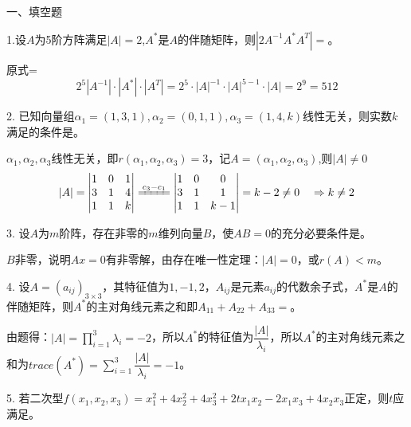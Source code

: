\documentclass{article}
\begin{document}
一、填空题

1.设$A$为5阶方阵满足$|A|=2$,$A^{*}$是$A$的伴随矩阵，则$|2A^{-1}A^{*}A^{T}|=$\underline{\hphantom{~~~~~~~~~~}}。

\begin{jie}
原式=
\begin{equation*}
2^{5}|A^{-1}|\cdot|A^*|\cdot|A^T|=2^{5}\cdot|A|^{-1}\cdot|A|^{5-1}\cdot|A|=2^9=512
\end{equation*}
\end{jie}

2. 已知向量组$\alpha_{1}=(1,3,1),\alpha_{2}=(0,1,1),\alpha_{3}=(1,4,k)$线性无关，则实数$k$满足的条件是\underline{\hphantom{~~~~~~~~~~}}。

\begin{jie}
$\alpha_{1},\alpha_{2},\alpha_{3}$线性无关，即$r(\alpha_{1},\alpha_{2},\alpha_{3})=3$，记$A=(\alpha_{1},\alpha_{2},\alpha_{3})$,则$|A|\neq0$
\begin{equation*}
  |A|=\begin{vmatrix}
       1& 0 & 1\\
       3 & 1 & 4\\
       1 & 1 & k
\end{vmatrix}\xlongequal{c_{3}-c_{1}}
\begin{vmatrix}
1& 0 & 0\\
3 & 1 & 1\\
1 & 1 & k-1
\end{vmatrix}=k-2\neq0~~~\Rightarrow k\neq 2
\end{equation*}
\end{jie}

3. 设$A$为$m$阶阵，存在非零的$m$维列向量$B$，使$AB=0$的充分必要条件是\underline{\hphantom{~~~~~~~~~~}}。

\begin{jie}
$B$非零，说明$Ax=0$有非零解，由存在唯一性定理：$|A|=0$，或$r(A)<m$。
\end{jie}

4. 设$A=(a_{ij})_{3\times 3}$，其特征值为$1,-1,2$，$A_{ij}$是元素$a_{ij}$的代数余子式，$A^{*}$是$A$的伴随矩阵，则$A^{*}$的主对角线元素之和即$A_{11}+A_{22}+A_{33}=$\underline{\hphantom{~~~~~~~~~~}}。

\begin{jie}
由题得：$|A|=\prod\limits_{i=1}^{3}\lambda_{i}=-2$，所以$A^*$的特征值为$\dfrac{|A|}{\lambda_{i}}$，所以$A^{*}$的主对角线元素之和为$trace(A^*)=\sum\limits_{i=1}^{3}\dfrac{|A|}{\lambda_{i}}=-1$。
\end{jie}

5. 若二次型$f(x_ {1},x_{2},x_{3})=x_{1}^{2}+4x_{2}^{2}+4x_{3}^{2}+2tx_{1}x_{2}-2x_{1}x_{3}+4x_{2}x_{3}$正定，则$t$应满足\underline{\hphantom{~~~~~~~~~~}}。
\end{document}
